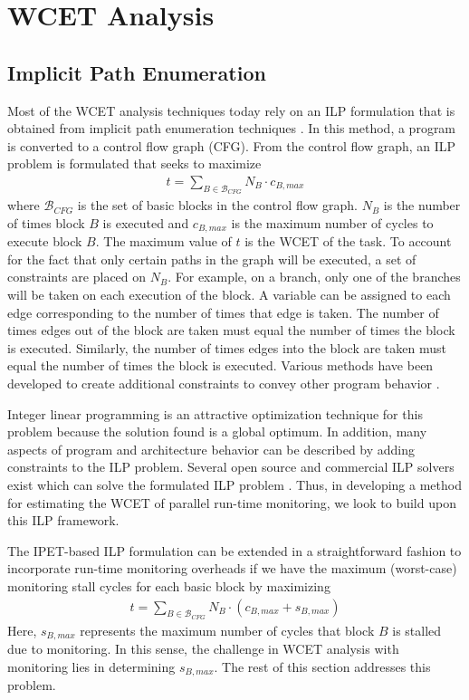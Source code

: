 \section{WCET Analysis}
\label{sec:monitoring_wcet.wcet}

\subsection{Implicit Path Enumeration}
\label{sec:formulation:ipet}

Most of the WCET analysis techniques today rely on an ILP formulation that is
obtained from implicit path enumeration techniques \cite{li-ipet-dac95}.  In
this method, a program is converted to a control flow graph (CFG). From the
control flow graph, an ILP problem is formulated that seeks to maximize
\begin{align*}
  t = \sum_{B \in \mathcal{B}_{CFG}}{N_B \cdot c_{B,max}}
\end{align*} 
where $\mathcal{B}_{CFG}$ is the set of basic blocks in the control flow graph.
$N_{B}$ is the number of times block $B$ is executed and $c_{B,max}$ is the
maximum number of cycles to execute block $B$. The maximum value of $t$ is the
WCET of the task.  To account for the fact that only certain paths in the graph
will be executed, a set of constraints are placed on $N_{B}$. For example, on a
branch, only one of the branches will be taken on each execution of the block.
A variable can be assigned to each edge corresponding to the number of times
that edge is taken.  The number of times edges out of the block are taken must
equal the number of times the block is executed.  Similarly, the number of
times edges into the block are taken must equal the number of times the block
is executed. Various methods have been developed to create additional
constraints to convey other program behavior \cite{li-ipet-dac95,
wcetsurvey-tecs08}.

Integer linear programming is an attractive optimization technique for this
problem because the solution found is a global optimum. In addition, many
aspects of program and architecture behavior can be described by adding
constraints to the ILP problem.  Several open source and commercial ILP solvers
exist which can solve the formulated ILP problem \cite{lpsolve, cplex}.  Thus,
in developing a method for estimating the WCET of parallel run-time monitoring,
we look to build upon this ILP framework.

The IPET-based ILP formulation can be extended in a straightforward fashion to
incorporate run-time monitoring overheads if we have the maximum (worst-case)
monitoring stall cycles for each basic block by maximizing
\begin{align*}
  t = \sum_{B \in \mathcal{B}_{CFG}}{N_{B} \cdot (c_{B,max} + s_{B,max})}
\end{align*}
Here, $s_{B,max}$ represents the maximum number of cycles that block $B$ is
stalled due to monitoring. In this sense, the challenge in WCET analysis with
monitoring lies in determining $s_{B,max}$.  The rest of this section addresses
this problem.

